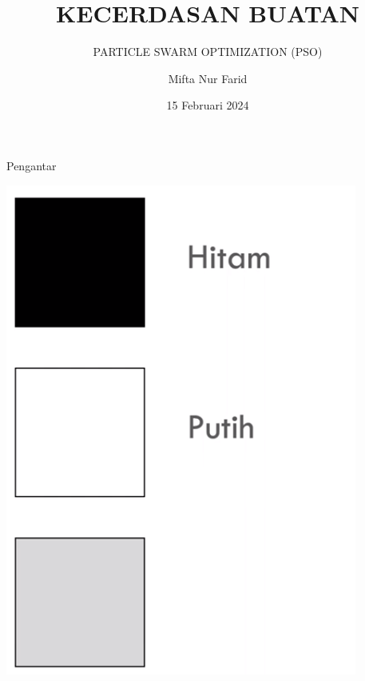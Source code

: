 \documentclass[pdflatex,compress,mathserif]{beamer}
\title{KECERDASAN BUATAN}
\subtitle{PARTICLE SWARM OPTIMIZATION (PSO)}
\author{Mifta Nur Farid}
\date{15 Februari 2024}
\begin{document}
\maketitle

\begin{frame}{Pengantar}
	\begin{center}
		\includegraphics[height=0.7\textheight]{img/01}
	\end{center}
\end{frame}
\end{document}
